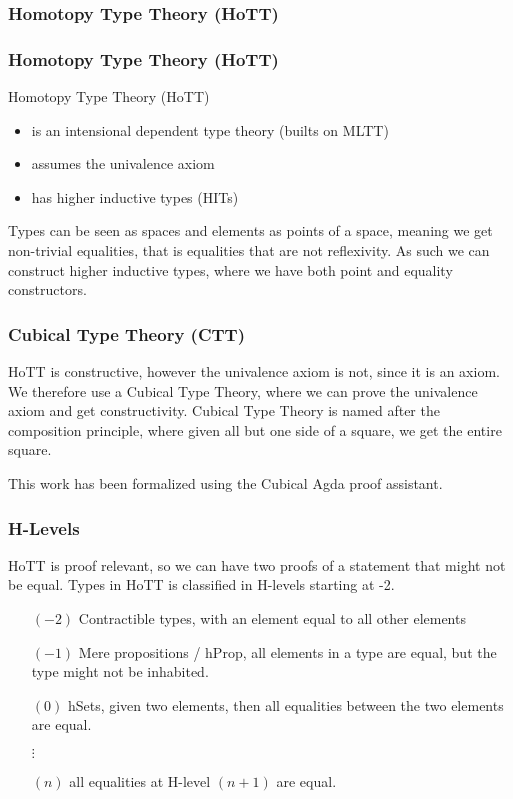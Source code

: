 \documentclass[xelatex,mathserif,serif,notheorems]{beamer} %
\theoremstyle{plain} %
\theoremstyle{definition}
\theoremstyle{remark}
\newcommand*{\pathterm}[1]{\textcolor{green!65!red!75!black}{#1}}
\newcommand*{\type}[1]{\textcolor{magenta!90!black}{#1}}
\newcommand{\ct}{%
  \mathchoice{\mathbin{\raisebox{0.5ex}{$\displaystyle\centerdot$}}}%
             {\mathbin{\raisebox{0.5ex}{$\centerdot$}}}%
             {\mathbin{\raisebox{0.25ex}{$\scriptstyle\,\centerdot\,$}}}%
             {\mathbin{\raisebox{0.1ex}{$\scriptscriptstyle\,\centerdot\,$}}}
}
\begin{document}
\subsubsection{Homotopy Type Theory (HoTT)}
\begin{frame}
  \frametitle{Homotopy Type Theory (HoTT)}
  Homotopy Type Theory (HoTT)
  \begin{itemize}
  \item is an intensional dependent type theory (builts on MLTT)
  \item assumes the univalence axiom
  \item has higher inductive types (HITs)
  \end{itemize}
  Types can be seen as spaces and elements as points of a space, meaning we get non-trivial equalities, that is equalities that are not reflexivity. As such we can construct higher inductive types, where we have both point and equality constructors.
\end{frame}

\begin{frame}[fragile]
  \frametitle{Cubical Type Theory (CTT)}
  HoTT is constructive, however the univalence axiom is not, since it is an axiom. We therefore use a Cubical Type Theory, where we can prove the univalence axiom and get constructivity. Cubical Type Theory is named after the composition principle, where given all but one side of a square, we get the entire square.
  \begin{figure}[h]
    \centering
  \end{figure}
  This work has been formalized using the Cubical Agda proof assistant.
\end{frame}

\begin{frame}
  \frametitle{H-Levels}
  HoTT is proof relevant, so we can have two proofs of a statement that might not be equal. Types in HoTT is classified in H-levels starting at -2.
  \begin{itemize}
  \item[\((-2)\)] Contractible types, with an element equal to all other elements
  \item[\((-1)\)] Mere propositions / hProp, all elements in a type are equal, but the type might not be inhabited.
  \item[\((0)\)] hSets, given two elements, then all equalities between the two elements are equal.
    \\
    \strut\hspace{-5mm}\(\vdots\)
  \item[\((n)\)] all equalities at H-level \((n+1)\) are equal.
  \end{itemize}
\end{frame}
\end{document}
